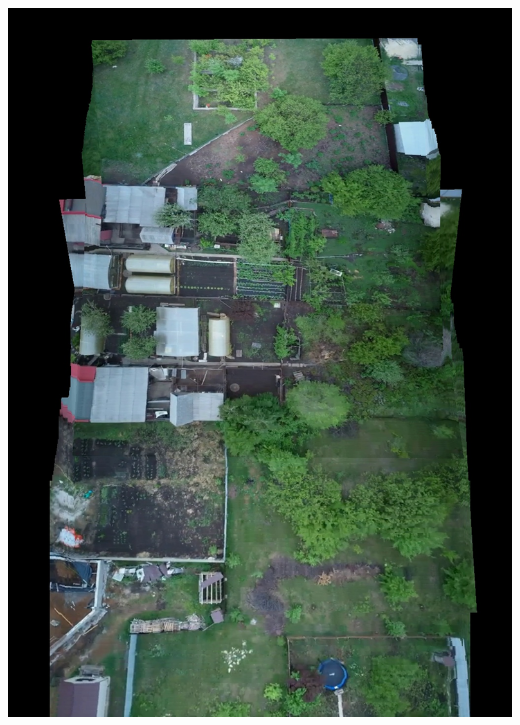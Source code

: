 \documentclass[12pt]{report}
\begin{document}
  \noindent
      \begin{minipage}{0.3\textwidth}
        \centering
        \includegraphics[width=\linewidth]{test_down.jpg}
    \end{minipage}%
    \hfill
\end{document}
